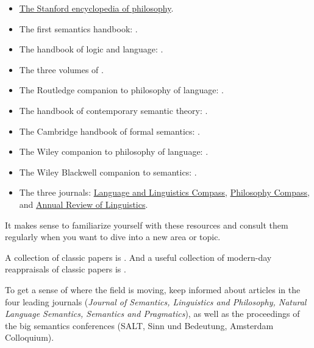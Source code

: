 \begin{itemize}
\item \href{https://plato.stanford.edu/}{The Stanford encyclopedia of philosophy}. 
\item The first semantics handbook: \cite{stechow-wunderlich-1991-Semantik}.
\item The handbook of logic and language:
  \cite{benthem-meulen-2011-HandbookLogicLanguage}.
\item The three volumes of \cite{maienborn-heusinger-portner-2011-Semantics-I,
    maienborn-heusinger-portner-2011-Semantics-II,
    maienborn-heusinger-portner-2011-Semantics-III}.
\item The Routledge companion to philosophy of language: \cite{russell-fara-2013-RoutledgeCompanionPhilosophyLanguage}.
\item The handbook of contemporary semantic theory: \cite{lappin-fox-2015-handbook}.
\item The Cambridge handbook of formal semantics: \cite{aloni-dekker-2016-CambridgeHandbookFormalSemantics}.
\item The Wiley companion to philosophy of language: \cite{hale-wright-miller-2017-CompanionPhilosophyLanguage}.
\item The Wiley Blackwell companion to semantics: \cite{gutzmann-matthewson-meier-rullmann-zimmermann-2020-WileyBlackwellCompanion}.
\item The three journals:
  \href{https://compass.onlinelibrary.wiley.com/journal/1749818x}{Language and
    Linguistics Compass},
  \href{https://compass.onlinelibrary.wiley.com/journal/17479991}{Philosophy
    Compass}, and
  \href{https://www.annualreviews.org/journal/linguistics}{Annual Review of
    Linguistics}.
\end{itemize}

It makes sense to familiarize yourself with these resources and consult them
regularly when you want to dive into a new area or topic.

A collection of classic papers is \cite{portner-partee-2002-essential}. And a
useful collection of modern-day reappraisals of classic papers is
\cite{mcnally-szabo-2022-ReaderGuideClassicPapers}.

To get a sense of where the field is moving, keep informed about articles in the
four leading journals (\emph{Journal of Semantics, Linguistics and Philosophy,
  Natural Language Semantics, Semantics and Pragmatics}), as well as the
proceedings of the big semantics conferences (SALT, Sinn und Bedeutung,
Amsterdam Colloquium).

